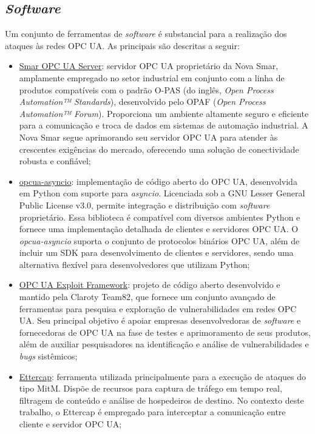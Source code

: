     \subsection{\textit{Software}} \label{subsec:software}

        Um conjunto de ferramentas de \textit{software} é substancial para a realização dos ataques às redes OPC UA. As principais são descritas a seguir:

        \begin{itemize}
            \item \underline{Smar OPC UA Server}: servidor OPC UA proprietário da Nova Smar, amplamente empregado no setor industrial em conjunto com a linha de produtos compatíveis com o padrão O-PAS (do inglês, \textit{Open Process Automation™ Standards}), desenvolvido pelo OPAF (\textit{Open Process Automation™ Forum}). Proporciona um ambiente altamente seguro e eficiente para a comunicação e troca de dados em sistemas de automação industrial. A Nova Smar segue aprimorando seu servidor OPC UA para atender às crescentes exigências do mercado, oferecendo uma solução de conectividade robusta e confiável;
            \item \underline{opcua-asyncio}: implementação de código aberto do OPC UA, desenvolvida em Python com suporte para \textit{asyncio}. Licenciada sob a GNU Lesser General Public License v3.0, permite integração e distribuição com \textit{software} proprietário. Essa biblioteca é compatível com diversos ambientes Python e fornece uma implementação detalhada de clientes e servidores OPC UA. O \textit{opcua-asyncio} suporta o conjunto de protocolos binários OPC UA, além de incluir um SDK para desenvolvimento de clientes e servidores, sendo uma alternativa flexível para desenvolvedores que utilizam Python;
            \item \underline{OPC UA Exploit Framework}: projeto de código aberto desenvolvido e mantido pela Claroty Team82, que fornece um conjunto avançado de ferramentas para pesquisa e exploração de vulnerabilidades em redes OPC UA. Seu principal objetivo é apoiar empresas desenvolvedoras de \textit{software} e fornecedoras de OPC UA na fase de testes e aprimoramento de seus produtos, além de auxiliar pesquisadores na identificação e análise de vulnerabilidades e \textit{bugs} sistêmicos;
            \item \underline{Ettercap}: ferramenta utilizada principalmente para a execução de ataques do tipo MitM. Dispõe de recursos para captura de tráfego em tempo real, filtragem de conteúdo e análise de hospedeiros de destino. No contexto deste trabalho, o Ettercap é empregado para interceptar a comunicação entre cliente e servidor OPC UA;

\end{itemize}

